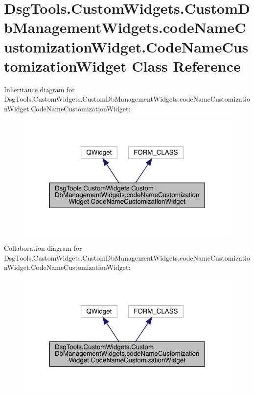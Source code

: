 \hypertarget{class_dsg_tools_1_1_custom_widgets_1_1_custom_db_management_widgets_1_1code_name_customization_wf164086e8f1ece2de77d7ffd06fc1ae2}{}\section{Dsg\+Tools.\+Custom\+Widgets.\+Custom\+Db\+Management\+Widgets.\+code\+Name\+Customization\+Widget.\+Code\+Name\+Customization\+Widget Class Reference}
\label{class_dsg_tools_1_1_custom_widgets_1_1_custom_db_management_widgets_1_1code_name_customization_wf164086e8f1ece2de77d7ffd06fc1ae2}


Inheritance diagram for Dsg\+Tools.\+Custom\+Widgets.\+Custom\+Db\+Management\+Widgets.\+code\+Name\+Customization\+Widget.\+Code\+Name\+Customization\+Widget\+:
\nopagebreak
\begin{figure}[H]
\begin{center}
\leavevmode
\includegraphics[width=318pt]{class_dsg_tools_1_1_custom_widgets_1_1_custom_db_management_widgets_1_1code_name_customization_w3b72d981aeb6247ff66225188f4a8993}
\end{center}
\end{figure}


Collaboration diagram for Dsg\+Tools.\+Custom\+Widgets.\+Custom\+Db\+Management\+Widgets.\+code\+Name\+Customization\+Widget.\+Code\+Name\+Customization\+Widget\+:
\nopagebreak
\begin{figure}[H]
\begin{center}
\leavevmode
\includegraphics[width=318pt]{class_dsg_tools_1_1_custom_widgets_1_1_custom_db_management_widgets_1_1code_name_customization_w50fec00ff9114d8c46c6fc5574070547}
\end{center}
\end{figure}
